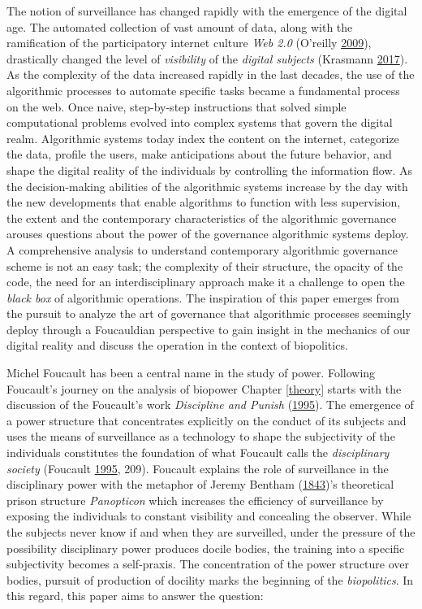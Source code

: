 \documentclass[12pt,twoside]{report}
\begin{document}
The notion of surveillance has changed rapidly with the emergence of the digital age. The automated collection of vast amount of data, along with the ramification of the participatory internet culture \emph{Web 2.0} (O'reilly \protect\hyperlink{ref-Oreilly2009}{2009}), drastically changed the level of \emph{visibility} of the \emph{digital subjects} (Krasmann \protect\hyperlink{ref-Krasmann2017}{2017}). As the complexity of the data increased rapidly in the last decades, the use of the algorithmic processes to automate specific tasks became a fundamental process on the web. Once naive, step-by-step instructions that solved simple computational problems evolved into complex systems that govern the digital realm. Algorithmic systems today index the content on the internet, categorize the data, profile the users, make anticipations about the future behavior, and shape the digital reality of the individuals by controlling the information flow. As the decision-making abilities of the algorithmic systems increase by the day with the new developments that enable algorithms to function with less supervision, the extent and the contemporary characteristics of the algorithmic governance arouses questions about the power of the governance algorithmic systems deploy. A comprehensive analysis to understand contemporary algorithmic governance scheme is not an easy task; the complexity of their structure, the opacity of the code, the need for an interdisciplinary approach make it a challenge to open the \emph{black box} of algorithmic operations. The inspiration of this paper emerges from the pursuit to analyze the art of governance that algorithmic processes seemingly deploy through a Foucauldian perspective to gain insight in the mechanics of our digital reality and discuss the operation in the context of biopolitics.

Michel Foucault has been a central name in the study of power. Following Foucault's journey on the analysis of biopower Chapter \ref{theory} starts with the discussion of the Foucault's work \emph{Discipline and Punish} (\protect\hyperlink{ref-Foucault1995}{1995}). The emergence of a power structure that concentrates explicitly on the conduct of its subjects and uses the means of surveillance as a technology to shape the subjectivity of the individuals constitutes the foundation of what Foucault calls the \emph{disciplinary society} (Foucault \protect\hyperlink{ref-Foucault1995}{1995}, 209). Foucault explains the role of surveillance in the disciplinary power with the metaphor of Jeremy Bentham (\protect\hyperlink{ref-Bentham1843}{1843})'s theoretical prison structure \emph{Panopticon} which increases the efficiency of surveillance by exposing the individuals to constant visibility and concealing the observer. While the subjects never know if and when they are surveilled, under the pressure of the possibility disciplinary power produces docile bodies, the training into a specific subjectivity becomes a self-praxis. The concentration of the power structure over bodies, pursuit of production of docility marks the beginning of the \emph{biopolitics}. In this regard, this paper aims to answer the question:
\end{document}
